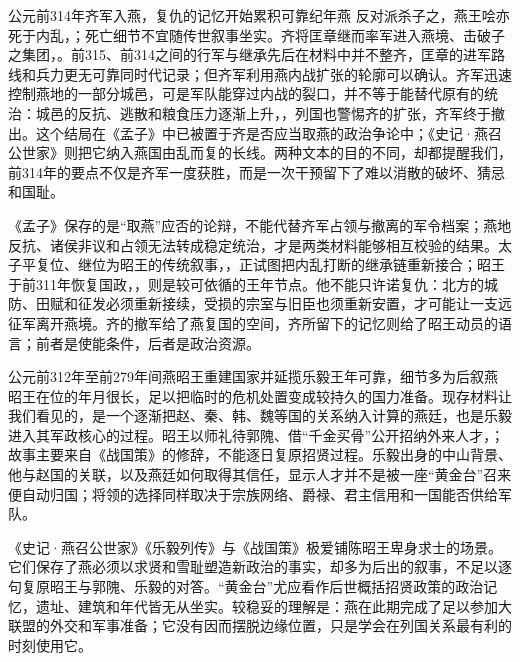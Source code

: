 \begin{event}{公元前314年}{齐军入燕，复仇的记忆开始累积}{可靠纪年}{燕}
反对派杀子之，燕王哙亦死于内乱，；死亡细节不宜随传世叙事坐实。齐将匡章继而率军进入燕境、击破子之集团，。前315、前314之间的行军与继承先后在材料中并不整齐，匡章的进军路线和兵力更无可靠同时代记录；但齐军利用燕内战扩张的轮廓可以确认。齐军迅速控制燕地的一部分城邑，可是军队能穿过内战的裂口，并不等于能替代原有的统治：城邑的反抗、逃散和粮食压力逐渐上升，，列国也警惕齐的扩张，齐军终于撤出。这个结局在《孟子》中已被置于齐是否应当取燕的政治争论中；《史记·燕召公世家》则把它纳入燕国由乱而复的长线。两种文本的目的不同，却都提醒我们，前314年的要点不仅是齐军一度获胜，而是一次干预留下了难以消散的破坏、猜忌和国耻。

《孟子》保存的是“取燕”应否的论辩，不能代替齐军占领与撤离的军令档案；燕地反抗、诸侯非议和占领无法转成稳定统治，才是两类材料能够相互校验的结果。太子平复位、继位为昭王的传统叙事，，正试图把内乱打断的继承链重新接合；昭王于前311年恢复国政，，则是较可依循的王年节点。他不能只许诺复仇：北方的城防、田赋和征发必须重新接续，受损的宗室与旧臣也须重新安置，才可能让一支远征军离开燕境。齐的撤军给了燕复国的空间，齐所留下的记忆则给了昭王动员的语言；前者是使能条件，后者是政治资源。
\end{event}

\begin{event}{公元前312年至前279年间}{燕昭王重建国家并延揽乐毅}{王年可靠，细节多为后叙}{燕}
昭王在位的年月很长，足以把临时的危机处置变成较持久的国力准备。现存材料让我们看见的，是一个逐渐把赵、秦、韩、魏等国的关系纳入计算的燕廷，也是乐毅进入其军政核心的过程。昭王以师礼待郭隗、借“千金买骨”公开招纳外来人才，；故事主要来自《战国策》的修辞，不能逐日复原招贤过程。乐毅出身的中山背景、他与赵国的关联，以及燕廷如何取得其信任，显示人才并不是被一座“黄金台”召来便自动归国；将领的选择同样取决于宗族网络、爵禄、君主信用和一国能否供给军队。

《史记·燕召公世家》《乐毅列传》与《战国策》极爱铺陈昭王卑身求士的场景。它们保存了燕必须以求贤和雪耻塑造新政治的事实，却多为后出的叙事，不足以逐句复原昭王与郭隗、乐毅的对答。“黄金台”尤应看作后世概括招贤政策的政治记忆，遗址、建筑和年代皆无从坐实。较稳妥的理解是：燕在此期完成了足以参加大联盟的外交和军事准备；它没有因而摆脱边缘位置，只是学会在列国关系最有利的时刻使用它。
\end{event}

